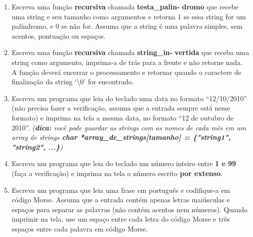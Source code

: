 \documentclass[a4paper,11pt]{article}
\begin{document}
\begin{multicols*}{2}
\begin{enumerate}
  \item Escreva uma função \textbf{recursiva} chamada \textbf{testa\_palin-} \textbf{dromo} que recebe uma string e seu tamanho como argumentos e retorna 1 se essa string for um palíndromo, e 0 se não for. Assuma que a string é uma palavra simples, sem acentos, pontuação ou espaços.

  \item Escreva uma função \textbf{recursiva} chamada \textbf{string\_in-} \textbf{vertida} que receba uma string como argumento, imprima-a de trás para a frente e não retorne nada. A função deverá encerrar o processamento e retornar quando o caractere de finalização da string `\textbackslash 0' for encontrado.

  \item Escreva um programa que leia do teclado uma data no formato ``12/10/2010'' (não precisa fazer a verificação, assuma que a entrada sempre está nesse formato) e imprima na tela a mesma data, no formato ``12 de outubro de 2010''. \textit{(\textbf{dica:} você pode guardar as strings com os nomes de cada mês em um array de strings \textbf{char *array\_de\_strings[tamanho] = \{"string1", "string2", ...\}})}

  \item Escreva um programa que leia do teclado um número inteiro entre \textbf{1 e 99} (faça a verificação) e imprima na tela o número escrito \textbf{por extenso}.

  \item Escreva um programa que leia uma frase em português e codifique-a em código Morse. Assuma que a entrada contém apenas letras maiúsculas e espaços para separar as palavras (não contém acentos nem números).  Quando imprimir na tela, use um espaço entre cada letra do código Morse e três espaços entre cada palavra em código Morse.


\end{enumerate}
\end{multicols*}
\end{document}
